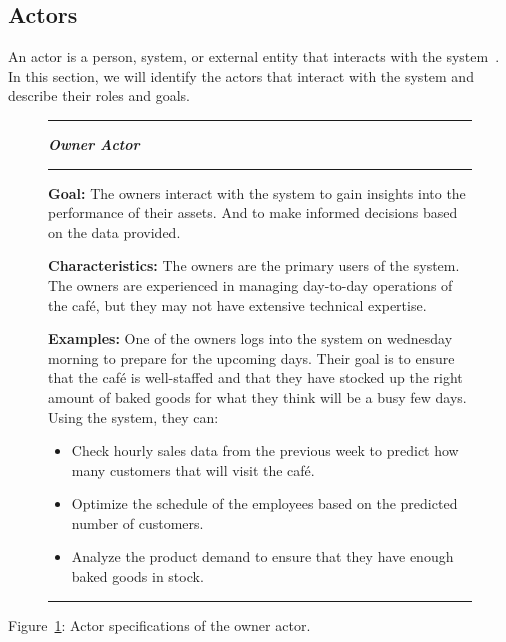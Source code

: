 \subsection{Actors}\label{subsec:actors}
An actor is a person, system, or external entity that interacts with the system~\cite{mathiassen2018}.
In this section, we will identify the actors that interact with the system and describe their roles and goals.

\begin{figure}[H]
    \noindent
    \rule{\textwidth}{0.4pt}
    \begin{center}
    \noindent
    \textit{\textbf{Owner Actor}}
    \end{center}

    \noindent
    \rule{\textwidth}{0.4pt}

    \noindent
    \textbf{Goal:} The owners interact with the system to gain insights into the performance of their assets.
    And to make informed decisions based on the data provided.
    \newline

    \noindent
    \textbf{Characteristics:} The owners are the primary users of the system.
    The owners are experienced in managing day-to-day operations of the café, but they may not have extensive technical
    expertise.
    \newline

    \noindent
    \textbf{Examples:} One of the owners logs into the system on wednesday morning to prepare for the upcoming days.
    Their goal is to ensure that the café is well-staffed and that they have stocked up the right amount of baked goods
    for what they think will be a busy few days.
    Using the system, they can:
    
    \begin{itemize}
        \item Check hourly sales data from the previous week to predict how many customers that will
        visit the café.
        \item Optimize the schedule of the employees based on the predicted number of customers.
        \item Analyze the product demand to ensure that they have enough baked goods in stock.
    \end{itemize}
    \noindent
    \rule{\textwidth}{0.4pt}\label{fig:actor-owner}
\end{figure}

Figure~\ref{fig:actor-owner}: Actor specifications of the owner actor.
